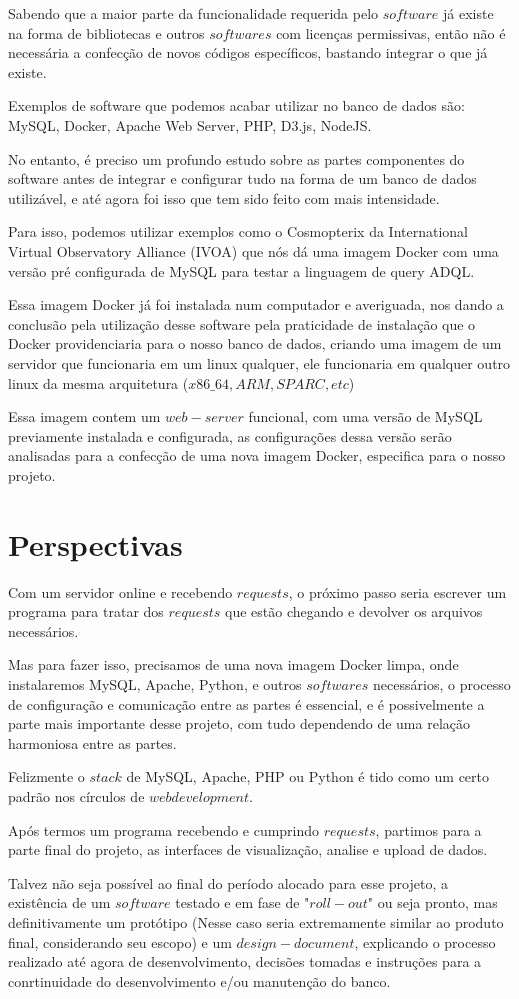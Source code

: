 \documentclass[a4paper,dvipsnames,twocolumn]{article}
\begin{document}
Sabendo que a maior parte da funcionalidade requerida pelo $software$ já existe na forma de bibliotecas e outros $softwares$ com licenças permissivas, então não é necessária a confecção de novos códigos específicos, bastando integrar o que já existe.

Exemplos de software que podemos acabar utilizar no banco de dados são: MySQL, Docker, Apache Web Server, PHP, D3.js, NodeJS.

No entanto, é preciso um profundo estudo sobre as partes componentes do software antes de integrar e configurar tudo na forma de um banco de dados utilizável, e até agora foi isso que tem sido feito com mais intensidade.

Para isso, podemos utilizar exemplos como o Cosmopterix da International Virtual Observatory Alliance (IVOA) que nós dá uma imagem Docker com uma versão pré configurada de MySQL para testar a linguagem de query ADQL. 

Essa imagem Docker já foi instalada num computador e averiguada, nos dando a conclusão pela utilização desse software pela praticidade de instalação que o Docker providenciaria para o nosso banco de dados, criando uma imagem de um servidor que funcionaria em um linux qualquer, ele funcionaria em qualquer outro linux da mesma arquitetura ($x86\_64, ARM, SPARC, etc$)

Essa imagem contem um $web-server$ funcional, com uma versão de MySQL previamente instalada e configurada, as configurações dessa versão serão analisadas para a confecção de uma nova imagem Docker, especifica para o nosso projeto. 

\section{Perspectivas}

Com um servidor online e recebendo $requests$, o próximo passo seria escrever um programa para tratar dos $requests$ que estão chegando e devolver os arquivos necessários.

Mas para fazer isso, precisamos de uma nova imagem Docker limpa, onde instalaremos MySQL, Apache, Python, e outros $softwares$ necessários, o processo de configuração e comunicação entre as partes é essencial, e é possivelmente a parte mais importante desse projeto, com tudo dependendo de uma relação harmoniosa entre as partes.

Felizmente o $stack$ de MySQL, Apache, PHP ou Python é tido como um certo padrão nos círculos de $web development$. 

Após termos um programa recebendo e cumprindo $requests$, partimos para a parte final do projeto, as interfaces de visualização, analise e upload de dados.

Talvez não seja possível ao final do período alocado para esse projeto, a existência de um $software$ testado e em fase de "$roll-out$" ou seja pronto, mas definitivamente um protótipo (Nesse caso seria extremamente similar ao produto final, considerando seu escopo) e um $design-document$, explicando o processo realizado até agora de desenvolvimento, decisões tomadas e instruções para a conrtinuidade do desenvolvimento e/ou manutenção do banco.
\end{document}
